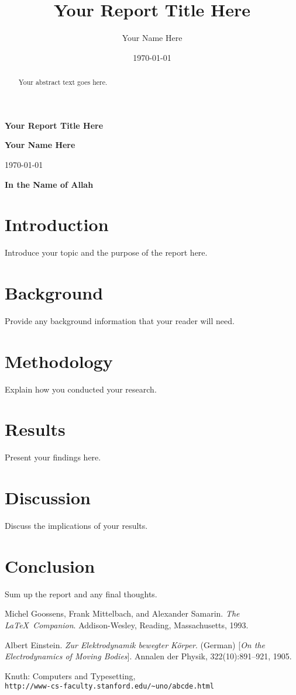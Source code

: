 \documentclass{article}
\title{Your Report Title Here}
\author{Your Name Here}
\date{\today}
\begin{document}
	
	\begin{titlepage}
		
		\centering
		\vspace*{2cm}
		\textbf{\LARGE Your Report Title Here}
		\vspace{1cm}
		

		
		\vfill
		
		\textbf{Your Name Here}
		
		\vspace{1cm}
		\today
	\end{titlepage}
	
	\begin{center}
		\textbf{In the Name of Allah}
	\end{center}
	\begin{abstract}
		Your abstract text goes here.
	\end{abstract}
	
	\section{Introduction}
	Introduce your topic and the purpose of the report here.
	
	\section{Background}
	Provide any background information that your reader will need.
	
	\section{Methodology}
	Explain how you conducted your research.
	
	\section{Results}
	Present your findings here.
	
	\section{Discussion}
	Discuss the implications of your results.
	
	\section{Conclusion}
	Sum up the report and any final thoughts.
	
	\begin{thebibliography}{9}
		Michel Goossens, Frank Mittelbach, and Alexander Samarin. 
		\textit{The \LaTeX\ Companion}. 
		Addison-Wesley, Reading, Massachusetts, 1993.
		
		Albert Einstein. 
		\textit{Zur Elektrodynamik bewegter Körper}. (German) 
		[\textit{On the Electrodynamics of Moving Bodies}]. 
		Annalen der Physik, 322(10):891–921, 1905.
		
		Knuth: Computers and Typesetting,
		\\\texttt{http://www-cs-faculty.stanford.edu/\~{}uno/abcde.html}
	\end{thebibliography}
	
\end{document}
